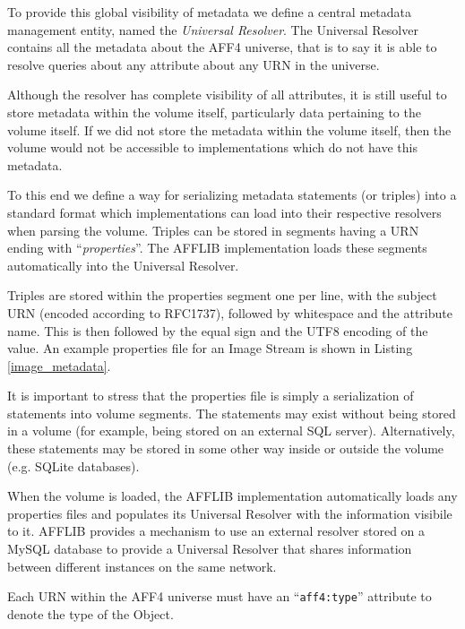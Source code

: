 \documentclass[10pt, conference]{IEEEtran}
\begin{document}
To provide this global visibility of metadata we define a central
metadata management entity, named the {\em Universal Resolver}. The
Universal Resolver contains all the metadata about the AFF4 universe,
that is to say it is able to resolve queries about any attribute about
any URN in the universe.

Although the resolver has complete visibility of all attributes, it is
still useful to store metadata within the volume itself, particularly
data pertaining to the volume itself. If we did not store the metadata
within the volume itself, then the volume would not be accessible to
implementations which do not have this metadata.

To this end we define a way for serializing metadata statements (or
triples) into a standard format which implementations can load into
their respective resolvers when parsing the volume. Triples can be
stored in segments having a URN ending with ``{\em properties}''. The
AFFLIB implementation loads these segments automatically into the
Universal Resolver. 

Triples are stored within the properties segment one per line, with
the subject URN (encoded according to RFC1737), followed by whitespace
and the attribute name. This is then followed by the equal sign and
the UTF8 encoding of the value. An example properties file for an
Image Stream is shown in Listing \ref{image_metadata}.

It is important to stress that the properties file is simply a
serialization of statements into volume segments. The statements may
exist without being stored in a volume (for example, being stored on
an external SQL server). Alternatively, these statements may be stored
in some other way inside or outside the volume (e.g. SQLite
databases).

When the volume is loaded, the AFFLIB implementation automatically
loads any properties files and populates its Universal Resolver with
the information visibile to it. AFFLIB provides a mechanism to use an
external resolver stored on a MySQL database to provide a Universal
Resolver that shares information between different instances on the
same network.

Each URN within the AFF4 universe must have an ``\texttt{aff4:type}''
attribute to denote the type of the Object.
\end{document}
